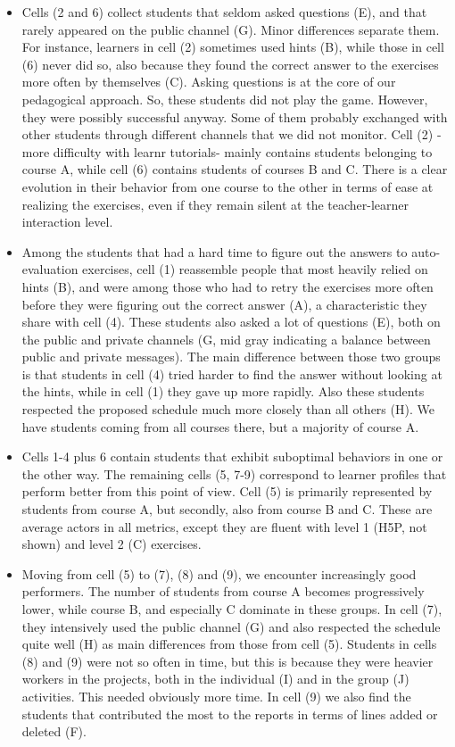 \documentclass{aims}
\theoremstyle{definition}
\begin{document}
\begin{itemize}
\item
  Cells (2 and 6) collect students that seldom asked questions (E), and
  that rarely appeared on the public channel (G). Minor differences
  separate them. For instance, learners in cell (2) sometimes used hints
  (B), while those in cell (6) never did so, also because they found the
  correct answer to the exercises more often by themselves (C). Asking
  questions is at the core of our pedagogical approach. So, these
  students did not play the game. However, they were possibly successful
  anyway. Some of them probably exchanged with other students through
  different channels that we did not monitor. Cell (2) -more difficulty
  with learnr tutorials- mainly contains students belonging to course A,
  while cell (6) contains students of courses B and C. There is a clear
  evolution in their behavior from one course to the other in terms of
  ease at realizing the exercises, even if they remain silent at the
  teacher-learner interaction level.
\item
  Among the students that had a hard time to figure out the answers to
  auto-evaluation exercises, cell (1) reassemble people that most
  heavily relied on hints (B), and were among those who had to retry the
  exercises more often before they were figuring out the correct answer
  (A), a characteristic they share with cell (4). These students also
  asked a lot of questions (E), both on the public and private channels
  (G, mid gray indicating a balance between public and private
  messages). The main difference between those two groups is that
  students in cell (4) tried harder to find the answer without looking
  at the hints, while in cell (1) they gave up more rapidly. Also these
  students respected the proposed schedule much more closely than all
  others (H). We have students coming from all courses there, but a
  majority of course A.
\item
  Cells 1-4 plus 6 contain students that exhibit suboptimal behaviors in
  one or the other way. The remaining cells (5, 7-9) correspond to
  learner profiles that perform better from this point of view. Cell (5)
  is primarily represented by students from course A, but secondly, also
  from course B and C. These are average actors in all metrics, except
  they are fluent with level 1 (H5P, not shown) and level 2 (C)
  exercises.
\item
  Moving from cell (5) to (7), (8) and (9), we encounter increasingly
  good performers. The number of students from course A becomes
  progressively lower, while course B, and especially C dominate in
  these groups. In cell (7), they intensively used the public channel
  (G) and also respected the schedule quite well (H) as main differences
  from those from cell (5). Students in cells (8) and (9) were not so
  often in time, but this is because they were heavier workers in the
  projects, both in the individual (I) and in the group (J) activities.
  This needed obviously more time. In cell (9) we also find the students
  that contributed the most to the reports in terms of lines added or
  deleted (F).
\end{itemize}
\end{document}
